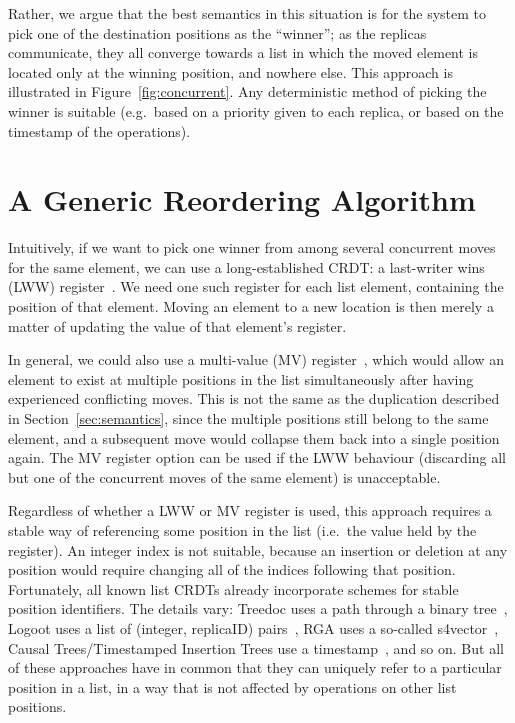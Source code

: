 \documentclass[sigplan,10pt]{acmart}
\begin{document}
Rather, we argue that the best semantics in this situation is for the system to pick one of the destination positions as the ``winner''; as the replicas communicate, they all converge towards a list in which the moved element is located only at the winning position, and nowhere else.
This approach is illustrated in Figure~\ref{fig:concurrent}.
Any deterministic method of picking the winner is suitable (e.g.\ based on a priority given to each replica, or based on the timestamp of the operations).

\section{A Generic Reordering Algorithm}\label{sec:algorithm}

Intuitively, if we want to pick one winner from among several concurrent moves for the same element, we can use a long-established CRDT: a last-writer wins (LWW) register~\cite{Shapiro:2011wy,Johnson:1975we}.
We need one such register for each list element, containing the position of that element.
Moving an element to a new location is then merely a matter of updating the value of that element's register.

In general, we could also use a multi-value (MV) register~\cite{Shapiro:2011wy}, which would allow an element to exist at multiple positions in the list simultaneously after having experienced conflicting moves.
This is not the same as the duplication described in Section~\ref{sec:semantics}, since the multiple positions still belong to the same element, and a subsequent move would collapse them back into a single position again.
The MV register option can be used if the LWW behaviour (discarding all but one of the concurrent moves of the same element) is unacceptable.

Regardless of whether a LWW or MV register is used, this approach requires a stable way of referencing some position in the list (i.e.\ the value held by the register).
An integer index is not suitable, because an insertion or deletion at any position would require changing all of the indices following that position.
Fortunately, all known list CRDTs already incorporate schemes for stable position identifiers.
The details vary: Treedoc uses a path through a binary tree~\cite{Preguica:2009fz}, Logoot uses a list of (integer, replicaID) pairs~\cite{Weiss:2009ht}, RGA uses a so-called s4vector~\cite{Roh:2011dw}, Causal Trees/Timestamped Insertion Trees use a timestamp~\cite{Grishchenko:2014eh,Attiya:2016kh}, and so on.
But all of these approaches have in common that they can uniquely refer to a particular position in a list, in a way that is not affected by operations on other list positions.
\end{document}
